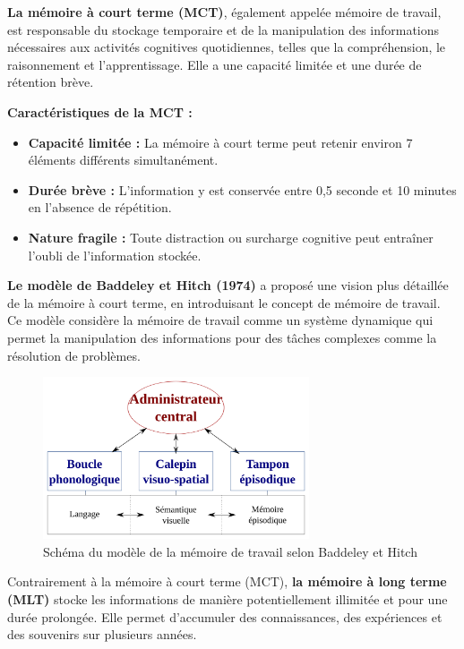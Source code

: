 \documentclass[12pt,a4paper]{report}
\begin{document}
\textbf{La mémoire à court terme (MCT)}, également appelée mémoire de travail, est responsable du stockage temporaire et de la manipulation des informations nécessaires aux activités cognitives quotidiennes, telles que la compréhension, le raisonnement et l'apprentissage. Elle a une capacité limitée et une durée de rétention brève.

\newpage
\textbf{Caractéristiques de la MCT :}
\begin{itemize}
    \item \textbf{Capacité limitée :} La mémoire à court terme peut retenir environ 7 éléments différents simultanément.
    \item \textbf{Durée brève :} L'information y est conservée entre 0,5 seconde et 10 minutes en l'absence de répétition.
    \item \textbf{Nature fragile :} Toute distraction ou surcharge cognitive peut entraîner l'oubli de l'information stockée.
\end{itemize}

\textbf{Le modèle de Baddeley et Hitch (1974)} a proposé une vision plus détaillée de la mémoire à court terme, en introduisant le concept de mémoire de travail. Ce modèle considère la mémoire de travail comme un système dynamique qui permet la manipulation des informations pour des tâches complexes comme la résolution de problèmes.

\begin{figure}[h]
    \centering
    \includegraphics[width=0.7\textwidth]{images/modele_baddeley_hitch.png}
    \caption{Schéma du modèle de la mémoire de travail selon Baddeley et Hitch}
    \label{fig:baddeley}
\end{figure}

\newpage
Contrairement à la mémoire à court terme (MCT), \textbf{la mémoire à long terme (MLT)} stocke les informations de manière potentiellement illimitée et pour une durée prolongée. Elle permet d'accumuler des connaissances, des expériences et des souvenirs sur plusieurs années.
\end{document}
